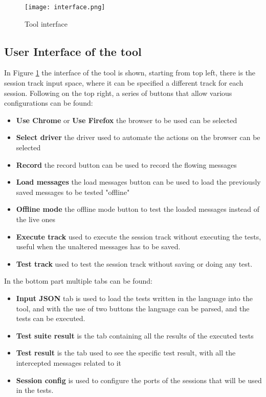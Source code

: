 \begin{figure}
    \texttt{[image: interface.png]}
    \caption{Tool interface}
    \label{fig:plugin_interface}
\end{figure}

\subsection{User Interface of the tool}
In Figure \ref{fig:plugin_interface} the interface of the tool is shown, starting from top left, there is the session track input space, where it can be specified a different track for each session. Following on the top right, a series of buttons that allow various configurations can be found:
\begin{itemize}
    \item \textbf{Use Chrome} or \textbf{Use Firefox} the browser to be used can be selected
    \item \textbf{Select driver} the driver used to automate the actions on the browser can be selected
    \item \textbf{Record} the record button can be used to record the flowing messages
    \item \textbf{Load messages} the load messages button can be used to load the previously saved messages to be tested "offline"
    \item \textbf{Offline mode} the offline mode button to test the loaded messages instead of the live ones
    \item \textbf{Execute track} used to execute the session track without executing the tests, useful when the unaltered messages has to be saved.
    \item \textbf{Test track} used to test the session track without saving or doing any test.
\end{itemize}

In the bottom part multiple tabs can be found:
\begin{itemize}
    \item \textbf{Input JSON} tab is used to load the tests written in the language into the tool, and with the use of two buttons the language can be parsed, and the tests can be executed.
    \item \textbf{Test suite result} is the tab containing all the results of the executed tests
    \item \textbf{Test result} is the tab used to see the specific test result, with all the intercepted messages related to it
    \item \textbf{Session config} is used to configure the ports of the sessions that will be used in the tests.
\end{itemize}

